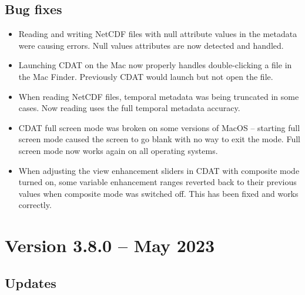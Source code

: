 \subsection*{ Bug fixes}
\begin{itemize}

\item Reading and writing NetCDF files with null attribute values in the
metadata were causing errors.  Null values attributes are now detected
and handled.

\item Launching CDAT on the Mac now properly handles double-clicking 
a file in the Mac Finder.  Previously CDAT would launch but not 
open the file.

\item When reading NetCDF files, temporal metadata was being truncated in 
some cases.  Now reading uses the full temporal metadata accuracy.

\item CDAT full screen mode was broken on some versions of MacOS -- starting 
full screen mode caused the screen to go blank with no way to exit the mode.
Full screen mode now works again on all operating systems.

\item When adjusting the view enhancement sliders in CDAT with composite mode
turned on, some variable enhancement ranges reverted back to their previous 
values when composite mode was switched off.  This has been fixed and works 
correctly.

\end{itemize}


\section{Version 3.8.0 -- May 2023}

\subsection*{ Updates}


